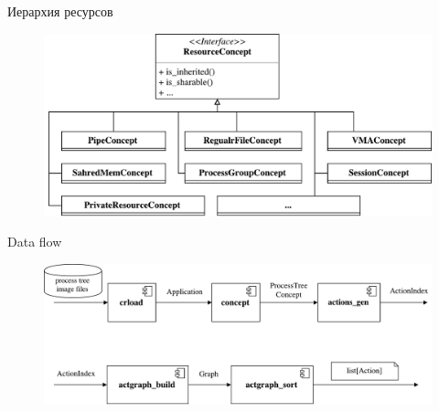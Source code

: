 \begin{frame}{Иерархия ресурсов}
	\begin{figure}[ht!]
	\centering
	\includegraphics[width=\textwidth]{fig/resourceConceptStruct}
	\end{figure}
\end{frame}

\begin{frame}{Data flow}
	\begin{figure}[ht!]
	\centering
	\includegraphics[width=\textwidth]{fig/flow}
	\end{figure}
\end{frame}

\backupend



